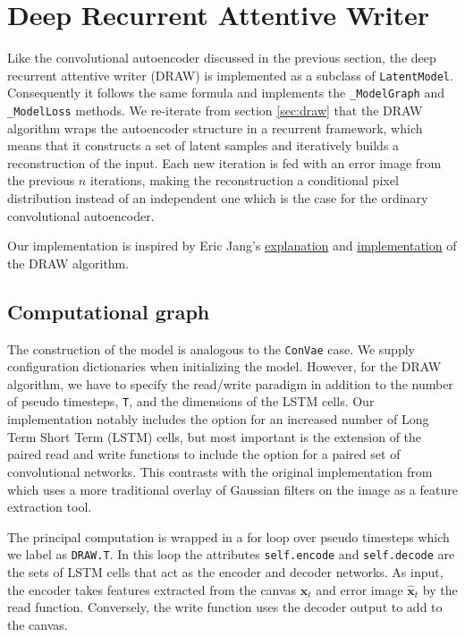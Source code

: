 
\section{Deep Recurrent Attentive Writer}\label{sec:draw_implement}

Like the convolutional autoencoder discussed in the previous section, the deep recurrent attentive writer (DRAW) is implemented as a subclass of \lstinline{LatentModel}. Consequently it follows the same formula and implements the  \lstinline{_ModelGraph} and \lstinline{_ModelLoss} methods. We re-iterate from section \ref{sec:draw} that the  DRAW algorithm wraps the autoencoder structure in a recurrent framework, which means that it constructs a set of latent samples and iteratively builds a reconstruction of the input. Each new iteration is fed with an error image from the previous $n$ iterations, making the reconstruction a conditional pixel distribution instead of an independent one which is the case for the ordinary convolutional autoencoder. 

Our implementation is inspired by Eric Jang's \href{https://blog.evjang.com/2016/06/understanding-and-implementing.html}{explanation} and \href{https://github.com/ericjang/draw}{implementation} of the DRAW algorithm.

\subsection{Computational graph}

The construction of the model is analogous to the \lstinline{ConVae} case. We supply configuration dictionaries when initializing the model. However, for the DRAW algorithm, we have to specify the read/write paradigm in addition to the number of pseudo timesteps, \lstinline{T}, and the dimensions of the LSTM cells.  Our implementation notably includes the option for an increased number of  Long Term Short Term (LSTM) cells, but most important is the extension of the paired read and write functions to include the option for a paired set of convolutional networks. This contrasts with the original implementation from \citet{Gregor2015} which uses a more traditional overlay of Gaussian filters on the image as a feature extraction tool. 

The principal computation is wrapped in a for loop over pseudo timesteps which we label as \lstinline{DRAW.T}. In this loop the attributes \lstinline{self.encode} and \lstinline{self.decode} are the sets of LSTM cells that act as the encoder and decoder networks. As input, the encoder takes features extracted from the canvas $\mathbf{x}_t$ and error image $\mathbf{\hat{x}}_t$ by the read function. Conversely, the write function uses the decoder output to add to the canvas. 

